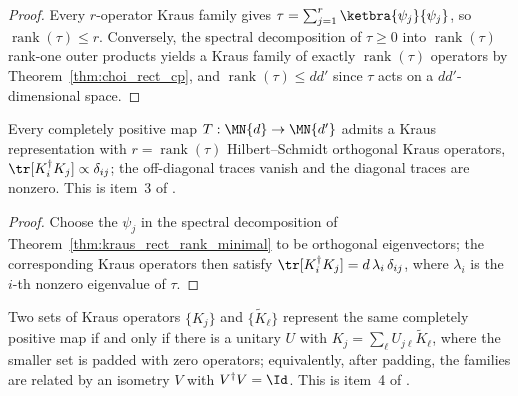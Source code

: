 \begin{proof}
    \leanok
    Every $r$-operator Kraus family gives
    $\tau=\sum_{j=1}^{r}\ketbra{\psi_j}{\psi_j}$, so
    $\operatorname{rank}(\tau)\leq r$. Conversely, the spectral
    decomposition of $\tau\geq0$ into $\operatorname{rank}(\tau)$ rank-one
    outer products yields a Kraus family of exactly
    $\operatorname{rank}(\tau)$ operators by
    Theorem~\ref{thm:choi_rect_cp}, and
    $\operatorname{rank}(\tau)\leq dd'$ since $\tau$ acts on a
    $dd'$-dimensional space.
\end{proof}

\begin{theorem}
    \label{thm:kraus_rect_orthogonal}
    \leanok
    Every completely positive map $T:\MN{d}\to\MN{d'}$ admits a Kraus
    representation with $r=\operatorname{rank}(\tau)$ Hilbert--Schmidt
    orthogonal Kraus operators, $\tr[K_i^\dagger K_j]\propto\delta_{ij}$;
    the off-diagonal traces vanish and the diagonal traces are nonzero.
    This is item~3 of \cite[Theorem~2.1]{Wolf2012Quantum}.
\end{theorem}

\begin{proof}
    \leanok
    Choose the $\psi_j$ in the spectral decomposition of
    Theorem~\ref{thm:kraus_rect_rank_minimal} to be orthogonal
    eigenvectors; the corresponding Kraus operators then satisfy
    $\tr[K_i^\dagger K_j]=d\,\lambda_i\,\delta_{ij}$, where $\lambda_i$ is
    the $i$-th nonzero eigenvalue of $\tau$.
\end{proof}

\begin{theorem}
    \label{thm:kraus_rect_freedom}
    \leanok
    Two sets of Kraus operators $\{K_j\}$ and $\{\widetilde{K}_\ell\}$
    represent the same completely positive map if and only if there is a
    unitary $U$ with $K_j=\sum_\ell U_{j\ell}\widetilde{K}_\ell$, where the
    smaller set is padded with zero operators; equivalently, after padding,
    the families are related by an isometry $V$ with $V^\dagger V=\Id$.
    This is item~4 of \cite[Theorem~2.1]{Wolf2012Quantum}.
\end{theorem}

